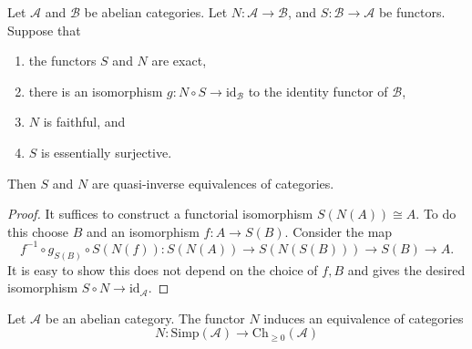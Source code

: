 \begin{lemma}
\label{lemma-S-N}
Let $\mathcal{A}$ and $\mathcal{B}$ be abelian categories.
Let $N : \mathcal{A} \to \mathcal{B}$, and
$S : \mathcal{B} \to \mathcal{A}$ be functors.
Suppose that
\begin{enumerate}
\item the functors $S$ and $N$ are exact,
\item there is an isomorphism $g : N \circ S \to \text{id}_\mathcal{B}$
to the identity functor of $\mathcal{B}$,
\item $N$ is faithful, and
\item $S$ is essentially surjective.
\end{enumerate}
Then $S$ and $N$ are quasi-inverse equivalences of categories.
\end{lemma}

\begin{proof}
It suffices to construct a functorial
isomorphism $S(N(A)) \cong A$. To do this
choose $B$ and an isomorphism $f : A  \to S(B)$.
Consider the map
$$
f^{-1} \circ g_{S(B)} \circ S(N(f)) :
S(N(A)) \to S(N(S(B))) \to S(B) \to A.
$$
It is easy to show this does not depend on
the choice of $f, B$ and gives the desired
isomorphism $S \circ N \to \text{id}_\mathcal{A}$.
\end{proof}

\begin{theorem}
\label{theorem-dold-kan}
Let $\mathcal{A}$ be an abelian category.
The functor $N$ induces an equivalence of
categories
$$
N :
\text{Simp}(\mathcal{A})
\longrightarrow
\text{Ch}_{\geq 0}(\mathcal{A})
$$
\end{theorem}

